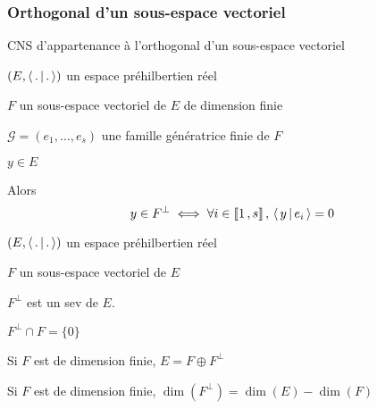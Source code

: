         \subsubsection{Orthogonal d’un sous-espace vectoriel}

        \begin{prop}{CNS d’appartenance à l’orthogonal d’un sous-espace vectoriel}{}
            \begin{soient}
                \item $(E,\left<\,.\,\middle|\,.\,\right>)$ un espace préhilbertien réel
                \item $F$ un sous-espace vectoriel de $E$ de dimension finie
                \item $\mathcal{G} = (e_1, \ldots, e_s)$ une famille génératrice finie de $F$
                \item $y \in E$
            \end{soient}
            Alors 
            \[ y \in F^{\perp} \iff \forall i \in \left\llbracket 1 \, , s \right\rrbracket, \, \left<\,y\,\middle|\,e_i\,\right> = 0 \]
        \end{prop}
    
        \begin{theo}{}{}
            \begin{soient}
                \item $(E,\left<\,.\,\middle|\,.\,\right>)$ un espace préhilbertien réel
                \item $F$ un sous-espace vectoriel de $E$
            \end{soient}
            \begin{alors}
                \item $F^{\perp}$ est un sev de $E$.
                \item $F^{\perp} \cap F = \{ 0 \}$
                \item Si $F$ est de dimension finie, $E = F \oplus F^{\perp}$
                \item Si $F$ est de dimension finie, $\dim(F^{\perp}) = \dim(E) - \dim(F)$
            \end{alors}       
        \end{theo}
    
